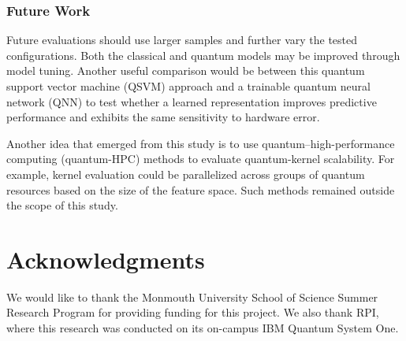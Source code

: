 \documentclass[letterpaper]{article} %
\begin{document}
\subsubsection{Future Work}

Future evaluations should use larger samples and further vary the tested configurations. Both the classical and quantum models may be improved through model tuning. Another useful comparison would be between this quantum support vector machine (QSVM) approach and a trainable quantum neural network (QNN) to test whether a learned representation improves predictive performance and exhibits the same sensitivity to hardware error.

Another idea that emerged from this study is to use quantum--high-performance computing (quantum-HPC) methods to evaluate quantum-kernel scalability. For example, kernel evaluation could be parallelized across groups of quantum resources based on the size of the feature space. Such methods remained outside the scope of this study.

\section{Acknowledgments}
We would like to thank the Monmouth University School of Science Summer Research Program for providing funding for this project. We also thank RPI, where this research was conducted on its on-campus IBM Quantum System One.


\end{document}
